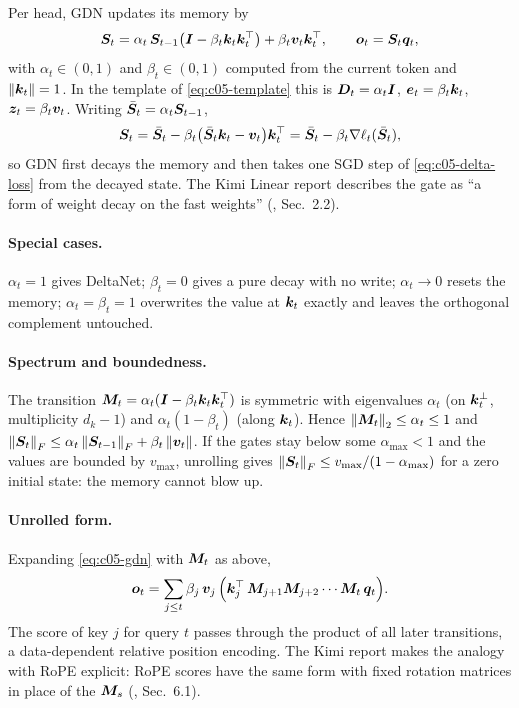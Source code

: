 Per head, GDN updates its memory by
\begin{equation}\label{eq:c05-gdn}
  \bm{S}_t = \alpha_t\,\bm{S}_{t-1}\big(\bm{I} - \beta_t\bm{k}_t\bm{k}_t^{\top}\big) + \beta_t\bm{v}_t\bm{k}_t^{\top},
  \qquad \bm{o}_t = \bm{S}_t\bm{q}_t,
\end{equation}
with $\alpha_t \in (0,1)$ and $\beta_t \in (0,1)$ computed from the current token and
$\left\lVert \bm{k}_t\right\rVert = 1$. In the template of \cref{eq:c05-template} this is $\bm{D}_t = \alpha_t\bm{I}$,
$\bm{e}_t = \beta_t\bm{k}_t$, $\bm{z}_t = \beta_t\bm{v}_t$. Writing $\bar{\bm{S}}_t = \alpha_t\bm{S}_{t-1}$,
\begin{equation}\label{eq:c05-gdn-sgd}
  \bm{S}_t = \bar{\bm{S}}_t - \beta_t\big(\bar{\bm{S}}_t\bm{k}_t - \bm{v}_t\big)\bm{k}_t^{\top}
        = \bar{\bm{S}}_t - \beta_t\nabla\ell_t(\bar{\bm{S}}_t),
\end{equation}
so GDN first decays the memory and then takes one SGD step of \cref{eq:c05-delta-loss} from the
decayed state. The Kimi Linear report describes the gate as ``a form of weight decay on the fast
weights'' (, Sec.~2.2).

\paragraph{Special cases.} $\alpha_t = 1$ gives DeltaNet; $\beta_t = 0$ gives a pure decay with no
write; $\alpha_t\to0$ resets the memory; $\alpha_t = \beta_t = 1$ overwrites the value at $\bm{k}_t$
exactly and leaves the orthogonal complement untouched.

\paragraph{Spectrum and boundedness.} The transition
$\bm{M}_t = \alpha_t(\bm{I} - \beta_t\bm{k}_t\bm{k}_t^{\top})$ is symmetric with eigenvalues $\alpha_t$ (on
$\bm{k}_t^\perp$, multiplicity $d_k-1$) and $\alpha_t(1-\beta_t)$ (along $\bm{k}_t$). Hence
$\left\lVert \bm{M}_t\right\rVert_2 \le \alpha_t \le 1$ and
$\left\lVert \bm{S}_t\right\rVert_F \le \alpha_t\left\lVert \bm{S}_{t-1}\right\rVert_F + \beta_t\left\lVert \bm{v}_t\right\rVert$. If the gates stay below some
$\alpha_{\max} < 1$ and the values are bounded by $v_{\max}$, unrolling gives
$\left\lVert \bm{S}_t\right\rVert_F \le v_{\max}/(1-\alpha_{\max})$ for a zero initial state: the memory cannot blow up.

\paragraph{Unrolled form.} Expanding \cref{eq:c05-gdn} with $\bm{M}_t$ as above,
\begin{equation}\label{eq:c05-gdn-unrolled}
  \bm{o}_t = \sum_{j\le t}\beta_j\,\bm{v}_j\,\Big(\bm{k}_j^{\top}\,\bm{M}_{j+1}\bm{M}_{j+2}\cdots\bm{M}_t\,\bm{q}_t\Big).
\end{equation}
The score of key $j$ for query $t$ passes through the product of all later transitions, a
data-dependent relative position encoding. The Kimi report makes the analogy with RoPE explicit:
RoPE scores have the same form with fixed rotation matrices in place of the $\bm{M}_s$
(, Sec.~6.1).

